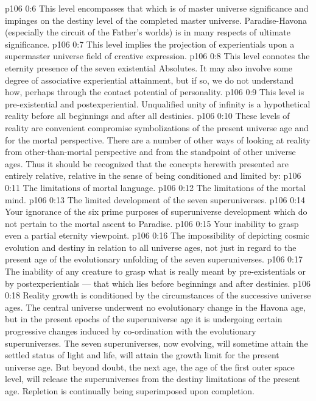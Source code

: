 \vs p106 0:6 \bibnobreakspace {} This level encompasses that which is of master universe significance and impinges on the destiny level of the completed master universe. Paradise\hyp{}Havona (especially the circuit of the Father’s worlds) is in many respects of ultimate significance.
\vs p106 0:7 \bibnobreakspace {} This level implies the projection of experientials upon a supermaster universe field of creative expression.
\vs p106 0:8 \bibnobreakspace {} This level connotes the eternity presence of the seven existential Absolutes. It may also involve some degree of associative experiential attainment, but if so, we do not understand how, perhaps through the contact potential of personality.
\vs p106 0:9 \bibnobreakspace {} This level is pre\hyp{}existential and postexperiential. Unqualified unity of infinity is a hypothetical reality before all beginnings and after all destinies.
\vs p106 0:10 \pc These levels of reality are convenient compromise symbolizations of the present universe age and for the mortal perspective. There are a number of other ways of looking at reality from other\hyp{}than\hyp{}mortal perspective and from the standpoint of other universe ages. Thus it should be recognized that the concepts herewith presented are entirely relative, relative in the sense of being conditioned and limited by:
\vs p106 0:11 \bibnobreakspace The limitations of mortal language.
\vs p106 0:12 \bibnobreakspace The limitations of the mortal mind.
\vs p106 0:13 \bibnobreakspace The limited development of the seven superuniverses.
\vs p106 0:14 \bibnobreakspace Your ignorance of the six prime purposes of superuniverse development which do not pertain to the mortal ascent to Paradise.
\vs p106 0:15 \bibnobreakspace Your inability to grasp even a partial eternity viewpoint.
\vs p106 0:16 \bibnobreakspace The impossibility of depicting cosmic evolution and destiny in relation to all universe ages, not just in regard to the present age of the evolutionary unfolding of the seven superuniverses.
\vs p106 0:17 \bibnobreakspace The inability of any creature to grasp what is really meant by pre\hyp{}existentials or by postexperientials --- that which lies before beginnings and after destinies.
\vs p106 0:18 \pc Reality growth is conditioned by the circumstances of the successive universe ages. The central universe underwent no evolutionary change in the Havona age, but in the present epochs of the superuniverse age it is undergoing certain progressive changes induced by co\hyp{}ordination with the evolutionary superuniverses. The seven superuniverses, now evolving, will sometime attain the settled status of light and life, will attain the growth limit for the present universe age. But beyond doubt, the next age, the age of the first outer space level, will release the superuniverses from the destiny limitations of the present age. Repletion is continually being superimposed upon completion.
